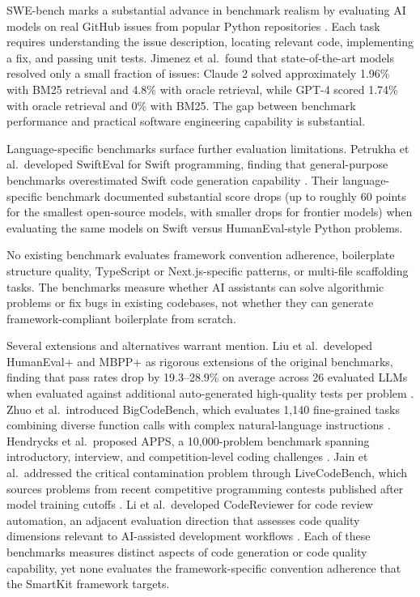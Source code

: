 \documentclass[12pt,a4paper]{report}
\begin{document}
SWE-bench marks a substantial advance in benchmark realism by evaluating AI models on real GitHub issues from popular Python repositories \parencite{jimenez2024swebench}. Each task requires understanding the issue description, locating relevant code, implementing a fix, and passing unit tests. Jimenez et al.\ found that state-of-the-art models resolved only a small fraction of issues: Claude 2 solved approximately 1.96\% with BM25 retrieval and 4.8\% with oracle retrieval, while GPT-4 scored 1.74\% with oracle retrieval and 0\% with BM25. The gap between benchmark performance and practical software engineering capability is substantial.

Language-specific benchmarks surface further evaluation limitations. Petrukha et al.\ developed SwiftEval for Swift programming, finding that general-purpose benchmarks overestimated Swift code generation capability \parencite{petrukha2025swifteval}. Their language-specific benchmark documented substantial score drops (up to roughly 60 points for the smallest open-source models, with smaller drops for frontier models) when evaluating the same models on Swift versus HumanEval-style Python problems.

No existing benchmark evaluates framework convention adherence, boilerplate structure quality, TypeScript or Next.js-specific patterns, or multi-file scaffolding tasks. The benchmarks measure whether AI assistants can solve algorithmic problems or fix bugs in existing codebases, not whether they can generate framework-compliant boilerplate from scratch.

Several extensions and alternatives warrant mention. Liu et al.\ developed HumanEval+ and MBPP+ as rigorous extensions of the original benchmarks, finding that pass rates drop by 19.3--28.9\% on average across 26 evaluated LLMs when evaluated against additional auto-generated high-quality tests per problem \parencite{liu2024correct}. Zhuo et al.\ introduced BigCodeBench, which evaluates 1,140 fine-grained tasks combining diverse function calls with complex natural-language instructions \parencite{zhuo2024bigcodebench}. Hendrycks et al.\ proposed APPS, a 10{,}000-problem benchmark spanning introductory, interview, and competition-level coding challenges \parencite{hendrycks2021apps}. Jain et al.\ addressed the critical contamination problem through LiveCodeBench, which sources problems from recent competitive programming contests published after model training cutoffs \parencite{jain2024livecodebench}. Li et al.\ developed CodeReviewer for code review automation, an adjacent evaluation direction that assesses code quality dimensions relevant to AI-assisted development workflows \parencite{li2022codereviewer}. Each of these benchmarks measures distinct aspects of code generation or code quality capability, yet none evaluates the framework-specific convention adherence that the SmartKit framework targets.
\end{document}

